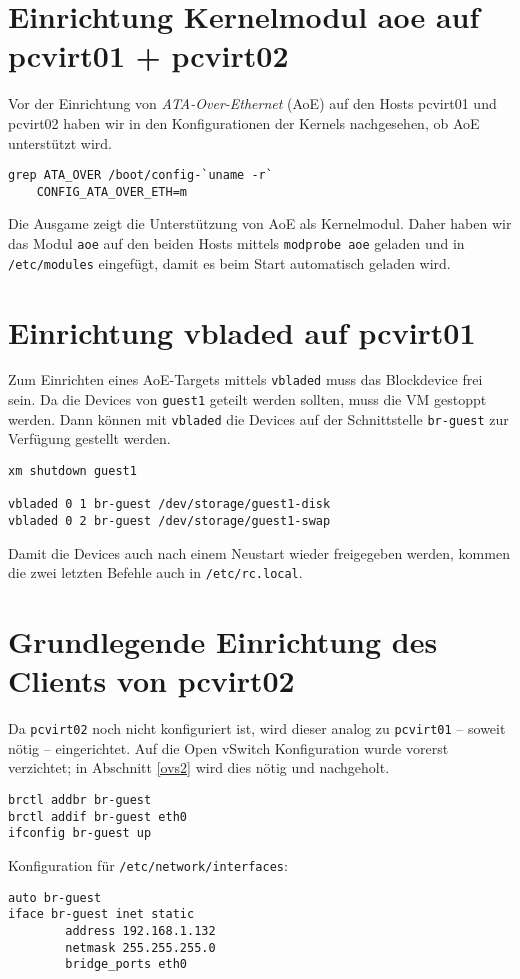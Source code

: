 \section{Einrichtung Kernelmodul aoe auf pcvirt01 + pcvirt02}
Vor der Einrichtung von \emph{ATA-Over-Ethernet} (AoE) \cite{hopkins2006aoe} auf den Hosts pcvirt01 und pcvirt02 haben wir in den Konfigurationen der Kernels nachgesehen, ob AoE unterstützt wird. 
\setupVerbatimOut
\begin{verbatim}
grep ATA_OVER /boot/config-`uname -r`
    CONFIG_ATA_OVER_ETH=m
\end{verbatim} 
Die Ausgame zeigt die Unterstützung von AoE als Kernelmodul. Daher haben wir das Modul \verb#aoe# auf den beiden Hosts mittels \verb#modprobe aoe# geladen und  in \verb#/etc/modules# eingefügt, damit es beim Start automatisch geladen wird. 

\section{Einrichtung vbladed auf pcvirt01}
Zum Einrichten eines AoE-Targets mittels \verb#vbladed# muss das Blockdevice frei sein. Da die Devices von \verb#guest1# geteilt werden sollten, muss die VM gestoppt werden. Dann können mit \verb#vbladed# die Devices auf der Schnittstelle \verb#br-guest# zur Verfügung gestellt werden. 
\setupVerbatimOut
\begin{verbatim}
xm shutdown guest1

vbladed 0 1 br-guest /dev/storage/guest1-disk  
vbladed 0 2 br-guest /dev/storage/guest1-swap
\end{verbatim}
Damit die Devices auch nach einem Neustart wieder freigegeben werden, kommen die zwei letzten Befehle auch in \verb#/etc/rc.local#. 
\section{Grundlegende Einrichtung des Clients von pcvirt02}
Da \verb#pcvirt02# noch nicht konfiguriert ist, wird dieser analog zu \verb#pcvirt01#  -- soweit nötig -- eingerichtet. Auf die Open vSwitch Konfiguration wurde vorerst verzichtet; in Abschnitt \ref{ovs2} wird dies nötig und nachgeholt.
\begin{verbatim}
brctl addbr br-guest
brctl addif br-guest eth0
ifconfig br-guest up
\end{verbatim}
Konfiguration für \verb#/etc/network/interfaces#:
\setupVerbatimOut
\begin{verbatim}
auto br-guest
iface br-guest inet static
        address 192.168.1.132
        netmask 255.255.255.0
        bridge_ports eth0
\end{verbatim}

